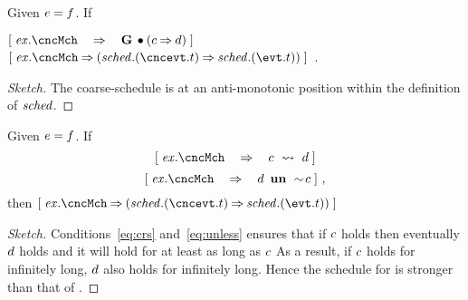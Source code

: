 \begin{Theorem}
  Given $e = f$. If
  \begin{center}
    $\ew{\execution.\cncMch \WIDE\limp \G \initially(\csched \limp
      \cnccsched)}$  $\ew{\execution.\cncMch \limp
      (\schedule.(\cncevt.t) \limp \schedule.(\evt.t))}$~.
  \end{center}

\end{Theorem}
\begin{proof}[Sketch]
  The coarse-schedule is at an anti-monotonic position within the definition of
  $\mathit{sched}$.
\end{proof}

\begin{Theorem}
  \label{thm:ref-rep-crs}
  Given $e = f$.  If
  \begin{equation}
    \ew{\execution.\cncMch \WIDE{\limp} \csched 
         \wide\leadsto \cnccsched}\label{eq:crs}
  \end{equation}
  \begin{equation}
    \label{eq:unless}
    \ew{\execution.\cncMch \WIDE{\limp} \cnccsched ~\un~ \spneg \csched}~,
  \end{equation}
  then $\ew{\execution.\cncMch \limp (\schedule.(\cncevt.t) \limp \schedule.(\evt.t))}$
\end{Theorem}
\begin{proof}[Sketch]
  Conditions~\eqref{eq:crs} and~\eqref{eq:unless} ensures that if $c$ holds
  then eventually $d$ holds and it will hold for at least as long as $c$
  As a result, if
  $c$ holds for infinitely long, $d$ also holds for infinitely long.  Hence
  the schedule for \cncevt is stronger than that of \evt.
\end{proof}

